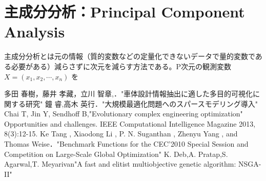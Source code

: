 \documentclass[11pt,a4j,notitlepage]{jreport}
\begin{document}
\section{主成分分析：Principal Component Analysis}
主成分分析とは元の情報（質的変数などの定量化できないデータで量的変数である必要がある）減らさずに次元を減らす方法である。P次元の観測変数$X=(x_1,x_2,\cdots ,x_n)$
を
\begin{thebibliography}{99}
\vspace{-1.0zh}
多田 春樹，藤井 孝藏，立川 智章,．"車体設計情報抽出に適した多目的可視化に関する研究"
\vspace{-1.0zh}
鐘 睿,高木 英行．"大規模最適化問題へのスパースモデリング導入"
\vspace{-1.0zh}
Chai T, Jin Y, Sendhoff B,"Evolutionary complex
engineering optimization" Opportunities and challenges. IEEE Computational Intelligence Magazine
2013, 8(3):12-15.
\vspace{-1.0zh}
Ke Tang , Xiaodong Li , P. N. Suganthan , Zhenyu Yang , and Thomas Weise．"Benchmark Functions for the CEC’2010 Special Session and Competition on Large-Scale Global Optimization"
K. Deb,A. Pratap,S. Agarwal,T. Meyarivan"A fast and elitist multiobjective genetic algorithm: NSGA-II"

\end{thebibliography}
\end{document}

